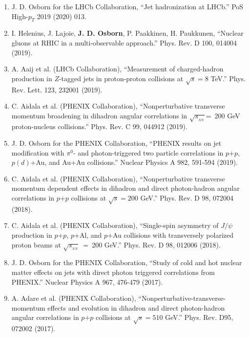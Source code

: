 \documentclass[11pt]{article}
\newcommand{\snn}{\sqrt{s_{_{NN}}}}
\begin{document}
\begin{flushleft}
\begin{center}
\begin{enumerate}
	\item J. D. Osborn for the LHCb Collaboration, ``Jet hadronization at LHCb.'' PoS High-$p_T$ 2019 (2020) 013.
	
	\item I. Helenius, J. Lajoie, {\bf{J. D. Osborn}}, P. Paakkinen, H. Paukkunen, ``Nuclear gluons at RHIC in a multi-observable approach.'' Phys. Rev. D 100, 014004 (2019).
	
	\item A. Aaij et al. (LHCb Collaboration), ``Measurement of charged-hadron production in $Z$-tagged jets in proton-proton collisions at $\sqrt{s}=8$ TeV.'' Phys. Rev. Lett. 123, 232001 (2019).
	
	\item C. Aidala et al. (PHENIX Collaboration), ``Nonperturbative transverse momentum broadening in dihadron angular correlations in $\sqrt{s_{_{NN}}}$=~200 GeV proton-nucleus collisions.''  Phys. Rev. C 99, 044912 (2019).

	\item J. D. Osborn for the PHENIX Collaboration, ``PHENIX results on jet modification with $\pi^0$- and photon-triggered two particle correlations in $p$$+$$p$, $p(d)$+Au, and Au+Au collisions.'' Nuclear Physics A 982, 591-594 (2019).

	\item C. Aidala et al. (PHENIX Collaboration), ``Nonperturbative transverse momentum dependent effects in dihadron and direct photon-hadron angular correlations in $p$$+$$p$ collisions at $\sqrt{s}=200$ GeV.'' Phys. Rev. D 98, 072004 (2018).
		
		
	\item C. Aidala et al. (PHENIX Collaboration), ``Single-spin asymmetry of $J/\psi$ production in $p$$+$$p$, $p$+Al, and $p$$+$Au collisions with transversely polarized proton beams at $\snn$~=~200 GeV.'' Phys. Rev. D 98, 012006 (2018).
	
	\item J. D. Osborn for the PHENIX Collaboration, ``Study of cold and hot nuclear matter effects on jets with direct photon triggered correlations from PHENIX.'' Nuclear Physics A 967, 476-479 (2017).
	
	\item A. Adare et al. (PHENIX Collaboration), ``Nonperturbative-transverse-momentum effects and evolution in dihadron and direct photon-hadron angular correlations in $p$$+$$p$ collisions at $\sqrt{s}=510$ GeV.''  Phys. Rev. D95, 072002 (2017).
	
\end{enumerate}
\end{center}
\end{flushleft}
\end{document}
